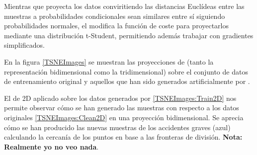             Mientras que  proyecta los datos conviritiendo las distancias Euclídeas entre las muestras a probabilidades condicionales sean similares entre sí siguiendo probabilidades normales, el  modifica la función de coste para proyectarlos mediante una distribución t-Student, permitiendo además trabajar con gradientes simplificados.


            En la figura \ref{TSNEImages} se muestran las proyecciones de  (tanto la representación bidimensional como la tridimensional) sobre el conjunto de datos de entrenamiento original y aquellos que han sido generados artificialmente por .

            El  de 2D aplicado sobre los datos generados por  \ref{TSNEImages:Train2D} nos permite observar cómo se han generado las muestras con respecto a los datos originales \ref{TSNEImages:Clean2D} en una proyección bidimensional. Se aprecia cómo se han producido las nuevas muestras de los accidentes graves (azul) calculando la cercanía de los puntos en base a las fronteras de división. \textbf{Nota: Realmente yo no veo nada}.


